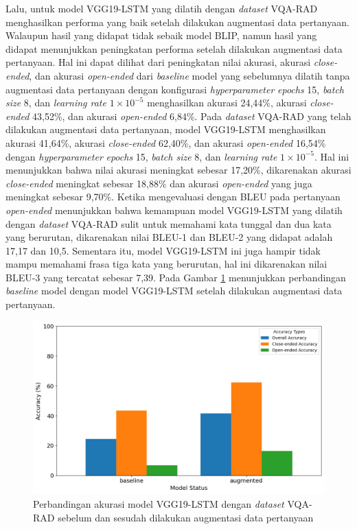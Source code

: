 \par Lalu, untuk model VGG19-LSTM yang dilatih dengan \textit{dataset} VQA-RAD menghasilkan performa yang baik setelah dilakukan augmentasi data pertanyaan. Walaupun hasil yang didapat tidak sebaik model BLIP, namun hasil yang didapat menunjukkan peningkatan performa setelah dilakukan augmentasi data pertanyaan. Hal ini dapat dilihat dari peningkatan nilai akurasi, akurasi \textit{close-ended}, dan akurasi \textit{open-ended} dari \textit{baseline} model yang sebelumnya dilatih tanpa augmentasi data pertanyaan dengan konfigurasi \textit{hyperparameter} \textit{epochs} 15, \textit{batch size} 8, dan \textit{learning rate} $1 \times 10^{-5}$ menghasilkan akurasi 24,44\%, akurasi \textit{close-ended} 43,52\%, dan akurasi \textit{open-ended} 6,84\%. Pada \textit{dataset} VQA-RAD yang telah dilakukan augmentasi data pertanyaan, model VGG19-LSTM menghasilkan akurasi 41,64\%, akurasi \textit{close-ended} 62,40\%, dan akurasi \textit{open-ended} 16,54\% dengan \textit{hyperparameter} \textit{epochs} 15, \textit{batch size} 8, dan \textit{learning rate} $1 \times 10^{-5}$. Hal ini menunjukkan bahwa nilai akurasi meningkat sebesar 17,20\%, dikarenakan akurasi \textit{close-ended} meningkat sebesar 18,88\% dan akurasi \textit{open-ended} yang juga meningkat sebesar 9,70\%. Ketika mengevaluasi dengan BLEU pada pertanyaan \textit{open-ended} menunjukkan bahwa kemampuan model VGG19-LSTM yang dilatih dengan \textit{dataset} VQA-RAD sulit untuk memahami kata tunggal dan dua kata yang berurutan, dikarenakan nilai BLEU-1 dan BLEU-2 yang didapat adalah 17,17 dan 10,5. Sementara itu, model VGG19-LSTM ini juga hampir tidak mampu memahami frasa tiga kata yang berurutan, hal ini dikarenakan nilai BLEU-3 yang tercatat sebesar 7,39. Pada Gambar \ref{fig:perbandingan-akurasi-vgg19-lstm-vqa-rad} menunjukkan perbandingan \textit{baseline} model dengan model VGG19-LSTM setelah dilakukan augmentasi data pertanyaan.

\begin{figure}[H]
  \centering
  \includegraphics[width=\textwidth]{image/bab4/vgg19-lstm-vqarad.png}
  \caption{Perbandingan akurasi model VGG19-LSTM dengan \textit{dataset} VQA-RAD sebelum dan sesudah dilakukan augmentasi data pertanyaan}
  \label{fig:perbandingan-akurasi-vgg19-lstm-vqa-rad}
\end{figure}


